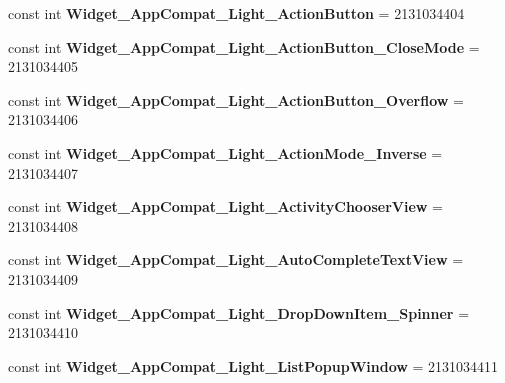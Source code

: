 \begin{DoxyCompactItemize}
\item 
\hypertarget{classClient_1_1Droid_1_1Resource_1_1Style_a3915ede22008391eeff0a10c505db3ee}{}const int {\bfseries Widget\+\_\+\+App\+Compat\+\_\+\+Light\+\_\+\+Action\+Button} = 2131034404\label{classClient_1_1Droid_1_1Resource_1_1Style_a3915ede22008391eeff0a10c505db3ee}

\item 
\hypertarget{classClient_1_1Droid_1_1Resource_1_1Style_aeb556cf7b6e859c6ce753a01b18d8da3}{}const int {\bfseries Widget\+\_\+\+App\+Compat\+\_\+\+Light\+\_\+\+Action\+Button\+\_\+\+Close\+Mode} = 2131034405\label{classClient_1_1Droid_1_1Resource_1_1Style_aeb556cf7b6e859c6ce753a01b18d8da3}

\item 
\hypertarget{classClient_1_1Droid_1_1Resource_1_1Style_ab096a9e0d56a24e25b30ef363164692e}{}const int {\bfseries Widget\+\_\+\+App\+Compat\+\_\+\+Light\+\_\+\+Action\+Button\+\_\+\+Overflow} = 2131034406\label{classClient_1_1Droid_1_1Resource_1_1Style_ab096a9e0d56a24e25b30ef363164692e}

\item 
\hypertarget{classClient_1_1Droid_1_1Resource_1_1Style_ab95673bbd149e9cc9ccbcd596276b90e}{}const int {\bfseries Widget\+\_\+\+App\+Compat\+\_\+\+Light\+\_\+\+Action\+Mode\+\_\+\+Inverse} = 2131034407\label{classClient_1_1Droid_1_1Resource_1_1Style_ab95673bbd149e9cc9ccbcd596276b90e}

\item 
\hypertarget{classClient_1_1Droid_1_1Resource_1_1Style_a8bae0dc13b4e5bb1a8b0b2b6bf9949ea}{}const int {\bfseries Widget\+\_\+\+App\+Compat\+\_\+\+Light\+\_\+\+Activity\+Chooser\+View} = 2131034408\label{classClient_1_1Droid_1_1Resource_1_1Style_a8bae0dc13b4e5bb1a8b0b2b6bf9949ea}

\item 
\hypertarget{classClient_1_1Droid_1_1Resource_1_1Style_a72cef3b01b7bc010531d6714bf77d26f}{}const int {\bfseries Widget\+\_\+\+App\+Compat\+\_\+\+Light\+\_\+\+Auto\+Complete\+Text\+View} = 2131034409\label{classClient_1_1Droid_1_1Resource_1_1Style_a72cef3b01b7bc010531d6714bf77d26f}

\item 
\hypertarget{classClient_1_1Droid_1_1Resource_1_1Style_a5934cc0473412e93b6c7e4bb8f22cdd5}{}const int {\bfseries Widget\+\_\+\+App\+Compat\+\_\+\+Light\+\_\+\+Drop\+Down\+Item\+\_\+\+Spinner} = 2131034410\label{classClient_1_1Droid_1_1Resource_1_1Style_a5934cc0473412e93b6c7e4bb8f22cdd5}

\item 
\hypertarget{classClient_1_1Droid_1_1Resource_1_1Style_a308685df1e8239c26f4d3b9bb8281248}{}const int {\bfseries Widget\+\_\+\+App\+Compat\+\_\+\+Light\+\_\+\+List\+Popup\+Window} = 2131034411\label{classClient_1_1Droid_1_1Resource_1_1Style_a308685df1e8239c26f4d3b9bb8281248}


\end{DoxyCompactItemize}
